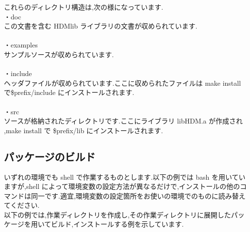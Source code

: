 \documentclass[twoside]{jbook}
\begin{document}
これらのディレクトリ構造は,次の様になっています. \\
{\sf ・doc \\}
この文書を含む HDMlib ライブラリの文書が収められています. \\\\
{\sf ・examples \\}
サンプルソースが収められています. \\\\
{\sf ・include \\}
ヘッダファイルが収められています.ここに収められたファイルは make install で\$prefix/include にインストールされます. \\\\
{\sf ・src \\}
ソースが格納されたディレクトリです.ここにライブラリ libHDM.a が作成され ,make install で \$prefix/lib にインストールされます.


\subsection{パッケージのビルド}
いずれの環境でも shell で作業するものとします.以下の例では bash を用いていますが,shell によって環境変数の設定方法が異なるだけで,インストールの他のコマンドは同一です.適宜,環境変数の設定箇所をお使いの環境でのものに読み替えてください.\\
以下の例では,作業ディレクトリを作成し,その作業ディレクトリに展開したパッケージを用いてビルド,インストールする例を示しています.
\end{document}
